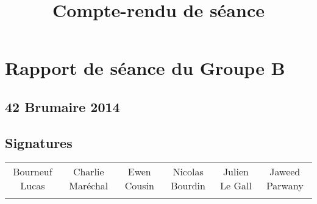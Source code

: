 
\title{Compte-rendu de séance}
\author{}
\date{} 

\pagestyle{empty} 
\pagestyle{fancy} 







\chapter*{Rapport de séance du Groupe B}	
\section*{42 Brumaire 2014}
	\vspace{12.1cm}


\section*{Signatures}

    	\begin{tabular*}{0.75\textwidth}{c | c | c | c | c | c}
    	    Bourneuf Lucas & Charlie Maréchal & Ewen Cousin & Nicolas Bourdin & Julien Le Gall & Jaweed Parwany\\
     	     & & & & &
    	\end{tabular*}




